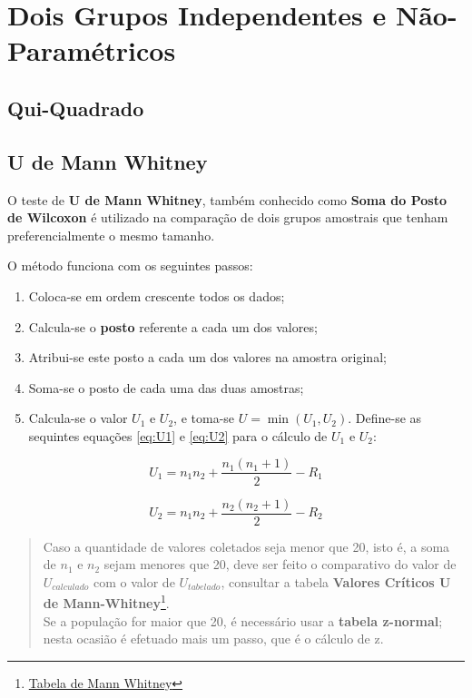 \documentclass[
]{book}
\providecommand{\tightlist}{%
  \setlength{\itemsep}{0pt}\setlength{\parskip}{0pt}}
\begin{document}
\hypertarget{dois-grupos-independentes-e-nuxe3o-paramuxe9tricos}{%
\chapter{Dois Grupos Independentes e Não-Paramétricos}\label{dois-grupos-independentes-e-nuxe3o-paramuxe9tricos}}

\hypertarget{qui-quadrado}{%
\section{Qui-Quadrado}\label{qui-quadrado}}

\hypertarget{u-de-mann-whitney}{%
\section{U de Mann Whitney}\label{u-de-mann-whitney}}

O teste de \textbf{U de Mann Whitney}, também conhecido como \textbf{Soma do Posto de Wilcoxon} é utilizado na comparação de dois grupos amostrais que tenham preferencialmente o mesmo tamanho.

O método funciona com os seguintes passos:

\begin{enumerate}
\def\labelenumi{\arabic{enumi}.}
\tightlist
\item
  Coloca-se em ordem crescente todos os dados;
\item
  Calcula-se o \textbf{posto} referente a cada um dos valores;
\item
  Atribui-se este posto a cada um dos valores na amostra original;
\item
  Soma-se o posto de cada uma das duas amostras;
\item
  Calcula-se o valor \(U_1\) e \(U_2\), e toma-se \(U = \min(U_1,U_2)\). Define-se as sequintes equações \eqref{eq:U1} e \eqref{eq:U2} para o cálculo de \(U_1\) e \(U_2\):
\end{enumerate}

\begin{equation}
  U_1 = n_1 n_2 + \frac{n_1(n_1+1)}{2} - R_1 
  \label{eq:U1}
\end{equation}

\begin{equation}
U_2 = n_1 n_2 + \frac{n_2(n_2+1)}{2} - R_2
\label{eq:U2}
\end{equation}

\begin{quote}
Caso a quantidade de valores coletados seja menor que 20, isto é, a soma de \(n_1\) e \(n_2\) sejam menores que 20, deve ser feito o comparativo do valor de \(U_{calculado}\) com o valor de \(U_{tabelado}\), consultar a tabela \textbf{Valores Críticos U de Mann-Whitney}\footnote{\href{https://ocw.umb.edu/psychology/psych-270/other-materials/RelativeResourceManager.pdf}{Tabela de Mann Whitney}}.\\
Se a população for maior que 20, é necessário usar a \textbf{tabela z-normal}; nesta ocasião é efetuado mais um passo, que é o cálculo de z.
\end{quote}
\end{document}
